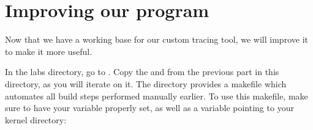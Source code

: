 \section{Improving our program}

Now that we have a working base for our custom tracing tool, we will improve it
to make it more useful.

In the labs directory, go to . Copy the
 and  from the previous
part in this directory, as you will iterate on it. The directory provides a
makefile which automates all build steps performed manually earlier. To use
this makefile, make sure to have your  variable
properly set, as well as a  variable pointing to your kernel
directory:

